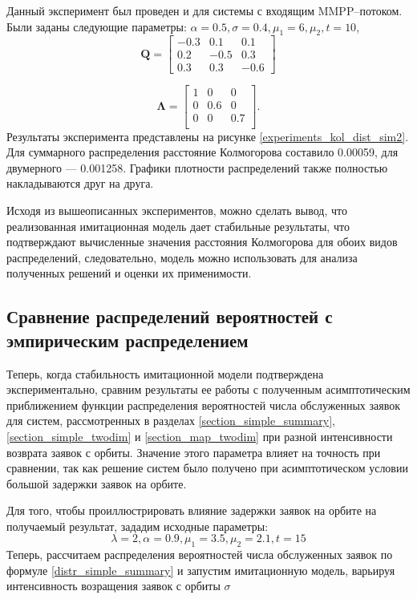 Данный эксперимент был проведен и для системы с входящим MMPP--потоком. Были заданы следующие параметры: $\alpha = 0.5, \sigma = 0.4, \mu_{1} = 6, \mu_{2}, t = 10 $,
\begin{equation*}
	\boldsymbol{Q}=\begin{bmatrix}
		-0.3 &  0.1 &  0.1\\
		0.2 & -0.5 &  0.3\\
		0.3 &  0.3 &  -0.6
	\end{bmatrix}
\end{equation*}

\begin{equation*}
	\boldsymbol{\Lambda}=\begin{bmatrix}
		1 &	0 & 0\\
		0 &	0.6 & 0\\
		0 &	0 & 0.7\\
	\end{bmatrix}.
\end{equation*}
Результаты эксперимента представлены на рисунке \ref{experiments_kol_dist_sim2}. Для суммарного распределения расстояние Колмогорова составило 0.00059, для двумерного --- 0.001258. Графики плотности распределений также полностью накладываются друг на друга.

Исходя из вышеописанных экспериментов, можно сделать вывод, что реализованная имитационная модель дает стабильные результаты, что подтверждают вычисленные значения расстояния Колмогорова для обоих видов распределений, следовательно, модель можно использовать для анализа полученных решений и оценки их применимости.
\subsection{Сравнение распределений вероятностей с эмпирическим распределением}
Теперь, когда стабильность имитационной модели подтверждена экспериментально, сравним результаты ее работы с полученным асимптотическим приближением функции распределения вероятностей числа обслуженных заявок для систем, рассмотренных в разделах \ref{section_simple_summary}, \ref{section_simple_twodim} и \ref{section_map_twodim} при разной интенсивности возврата заявок с орбиты. Значение этого параметра влияет на точность при сравнении, так как решение систем было получено при асимптотическом условии большой задержки заявок на орбите.

Для того, чтобы проиллюстрировать влияние задержки заявок на орбите на получаемый результат, зададим исходные параметры:
\begin{equation} \label{simple_summary_input_params}
	\lambda = 2,
	\alpha = 0.9,
	\mu_{1} = 3.5,
	\mu_{2} = 2.1, 
	t = 15
\end{equation}
Теперь, рассчитаем распределения вероятностей числа обслуженных заявок по формуле \eqref{distr_simple_summary} и запустим имитационную модель, варьируя интенсивность возращения заявок с орбиты $\sigma$

